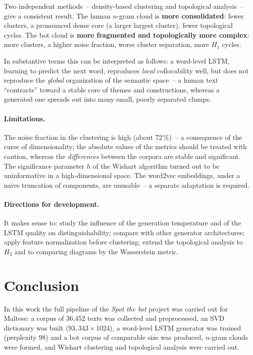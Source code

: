 \documentclass[12pt,a4paper]{article}
\begin{document}
Two independent methods~-- density-based clustering and topological analysis~--
give a consistent result. The human $n$-gram cloud is \textbf{more
consolidated}: fewer clusters, a pronounced dense core (a larger largest
cluster), fewer topological cycles. The bot cloud is \textbf{more fragmented and
topologically more complex}: more clusters, a higher noise fraction, worse
cluster separation, more $H_1$ cycles.

In substantive terms this can be interpreted as follows: a word-level LSTM,
learning to predict the next word, reproduces \emph{local} collocability well,
but does not reproduce the \emph{global} organization of the semantic space~--
a human text ``contracts'' toward a stable core of themes and constructions,
whereas a generated one spreads out into many small, poorly separated clumps.

\paragraph{Limitations.} The noise fraction in the clustering is high (about
72\,\%)~-- a consequence of the curse of dimensionality; the absolute values of
the metrics should be treated with caution, whereas the \emph{differences}
between the corpora are stable and significant. The significance parameter $h$
of the Wishart algorithm turned out to be uninformative in a high-dimensional
space. The word2vec embeddings, under a naive truncation of components, are
unusable~-- a separate adaptation is required.

\paragraph{Directions for development.} It makes sense to: study the influence
of the generation temperature and of the LSTM quality on distinguishability;
compare with other generator architectures; apply feature normalization before
clustering; extend the topological analysis to $H_2$ and to comparing diagrams
by the Wasserstein metric.

\section{Conclusion}

In this work the full pipeline of the \emph{Spot the bot} project was carried
out for Maltese: a corpus of 36{,}452 texts was collected and preprocessed, an
SVD dictionary was built ($93{,}343\times1024$), a word-level LSTM generator was
trained (perplexity 98) and a bot corpus of comparable size was produced,
$n$-gram clouds were formed, and Wishart clustering and topological analysis
were carried out.
\end{document}
